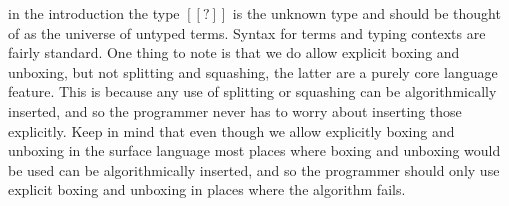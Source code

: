 in the introduction the type $[[?]]$ is the unknown type and should be
thought of as the universe of untyped terms.
Syntax for terms and typing contexts are fairly standard.  One thing
to note is that we do allow explicit boxing and unboxing, but not
splitting and squashing, the latter are a purely core language
feature.  This is because any use of splitting or squashing can be
algorithmically inserted, and so the programmer never has to worry
about inserting those explicitly.  Keep in mind that even though we
allow explicitly boxing and unboxing in the surface language most
places where boxing and unboxing would be used can be algorithmically
inserted, and so the programmer should only use explicit boxing and
unboxing in places where the algorithm fails.

